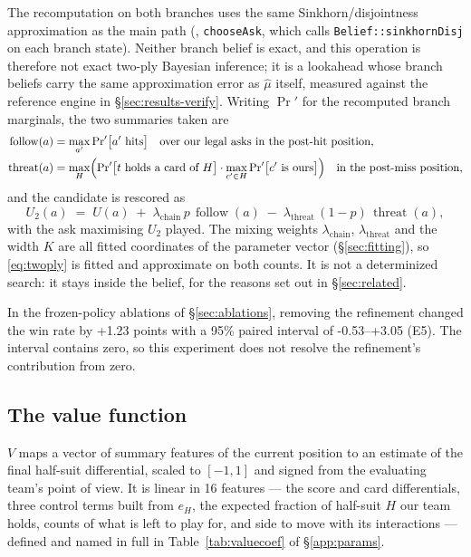 \documentclass[11pt]{article}
\theoremstyle{definition}
\newcommand{\numAblTwoPly}{+1.23}
\newcommand{\numAblTwoPlyCI}{-0.53--+3.05}
\newcommand{\numValueFeats}{16}
\begin{document}
The recomputation on both branches uses the same Sinkhorn/disjointness
approximation as the main path (, \texttt{chooseAsk},
which calls \texttt{Belief::sinkhornDisj} on each branch state). Neither branch
belief is exact, and this operation is therefore not exact two-ply Bayesian
inference; it is a lookahead whose branch beliefs carry the same approximation
error as $\hat\mu$ itself, measured against the reference engine in
\S\ref{sec:results-verify}. Writing $\Pr'$ for the recomputed branch marginals,
the two summaries taken are
\begin{align*}
  \operatorname{follow}(a) &= \max_{a'} \Pr\nolimits'\bigl[a' \text{ hits}\bigr]
    \quad \text{over our legal asks in the post-hit position,} \\
  \operatorname{threat}(a) &= \max_{H} \Bigl( \Pr\nolimits'\bigl[t \text{ holds a card of } H\bigr]\cdot
        \max_{c' \in H} \Pr\nolimits'\bigl[c' \text{ is ours}\bigr] \Bigr)
    \quad \text{in the post-miss position,}
\end{align*}
and the candidate is rescored as
\begin{equation}
  U_2(a) \;=\; U(a) \;+\; \lambda_{\mathrm{chain}}\, p\,\operatorname{follow}(a)
       \;-\; \lambda_{\mathrm{threat}}\,(1-p)\,\operatorname{threat}(a),
  \label{eq:twoply}
\end{equation}
with the ask maximising $U_2$ played. The mixing weights
$\lambda_{\mathrm{chain}}$, $\lambda_{\mathrm{threat}}$ and the width $K$ are
all fitted coordinates of the parameter vector (\S\ref{sec:fitting}), so
\eqref{eq:twoply} is fitted and approximate on both counts. It is not a
determinized search: it stays inside the belief, for the reasons set out in
\S\ref{sec:related}.

In the frozen-policy ablations of \S\ref{sec:ablations}, removing the refinement
changed the win rate by \numAblTwoPly{} points with a 95\% paired interval of
\numAblTwoPlyCI{} (E5). The interval contains zero, so this experiment does not
resolve the refinement's contribution from zero.

\subsection{The value function}
\label{sec:value}

$V$ maps a vector of summary features of the current position to an estimate
of the final half-suit differential, scaled to $[-1,1]$ and signed from the
evaluating team's point of view. It is linear in \numValueFeats{} features ---
the score and card differentials, three control terms built from $e_H$, the
expected fraction of half-suit $H$ our team holds, counts of what is left to
play for, and side to move with its interactions --- defined and named in full
in Table~\ref{tab:valuecoef} of \S\ref{app:params}.
\end{document}

